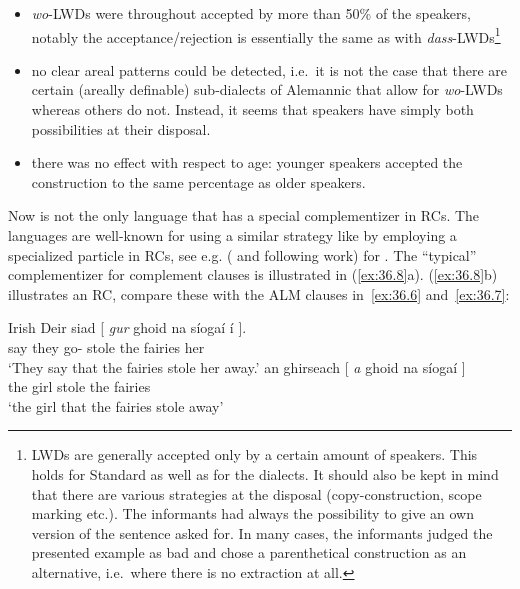 \documentclass[output=paper]{langsci/langscibook}
\begin{document}
\begin{itemize}

    \item \emph{wo}-\glspl{LWD} were throughout accepted by more than 50\% of the
        speakers, notably the acceptance/rejection is essentially the same as
        with \emph{dass}-\glspl{LWD}\footnote{\glspl{LWD} are generally accepted only by a
        certain amount of speakers. This holds for Standard  as well as
    for the dialects. It should also be kept in mind that there are various
strategies at the disposal (copy-construction, scope marking etc.). The
informants had always the possibility to give an own version of the sentence
asked for. In many cases, the informants judged the presented example as bad
and chose a parenthetical construction as an alternative, i.e.\ where there is
no extraction at all.}

    \item no clear areal patterns could be detected, i.e.\ it is not the case
        that there are certain (areally definable) sub-dialects of Alemannic
        that allow for \emph{wo}-\glspl{LWD} whereas others do not. Instead, it seems
        that  speakers have simply both possibilities at their
        disposal.

    \item there was no effect with respect to age: younger speakers accepted
        the construction to the same percentage as older speakers.

\end{itemize}

Now  is not the only language that has a special complementizer in
\glspl{RC}. The  languages are well-known for using a similar strategy
like  by employing a specialized particle in \glspl{RC}, see e.g.
(\citealt{McCloskey2001,McCloskey:2002a} and following work) for . The
\enquote{typical} complementizer for complement clauses is illustrated in
(\ref{ex:36.8}a).  (\ref{ex:36.8}b) illustrates an \gls{RC}, compare
these with the ALM clauses in~\eqref{ex:36.6} and~\eqref{ex:36.7}:

\ea\label{ex:36.8}Irish
    \ea
        \gll Deir siad [ \textit{gur} ghoid na síogaí í ].\\
            say they {} go-\Pst{} stole the fairies her\\
        \glt ‘They say that the fairies stole her away.’
    \ex
        \gll an ghirseach [ \textit{a} ghoid na síogaí \underline{\hphantom{2em}} ]\\
        the girl {} \Rci{} stole the fairies\\
        \glt ‘the girl that the fairies stole away’
    \z
\z
\end{document}
